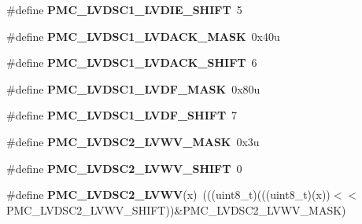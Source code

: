 \begin{DoxyCompactItemize}
\item 
\#define {\bfseries P\+M\+C\+\_\+\+L\+V\+D\+S\+C1\+\_\+\+L\+V\+D\+I\+E\+\_\+\+S\+H\+I\+FT}~5\hypertarget{group__PMC__Register__Masks_ga30ca240c9254a7e76123a3cf2bfdc40e}{}\label{group__PMC__Register__Masks_ga30ca240c9254a7e76123a3cf2bfdc40e}

\item 
\#define {\bfseries P\+M\+C\+\_\+\+L\+V\+D\+S\+C1\+\_\+\+L\+V\+D\+A\+C\+K\+\_\+\+M\+A\+SK}~0x40u\hypertarget{group__PMC__Register__Masks_ga65d04677ca16ad916563d6673cb8ecaa}{}\label{group__PMC__Register__Masks_ga65d04677ca16ad916563d6673cb8ecaa}

\item 
\#define {\bfseries P\+M\+C\+\_\+\+L\+V\+D\+S\+C1\+\_\+\+L\+V\+D\+A\+C\+K\+\_\+\+S\+H\+I\+FT}~6\hypertarget{group__PMC__Register__Masks_ga56654042b7934ca0e6c51f21db7d1201}{}\label{group__PMC__Register__Masks_ga56654042b7934ca0e6c51f21db7d1201}

\item 
\#define {\bfseries P\+M\+C\+\_\+\+L\+V\+D\+S\+C1\+\_\+\+L\+V\+D\+F\+\_\+\+M\+A\+SK}~0x80u\hypertarget{group__PMC__Register__Masks_ga44ae12d2d3e732cd25a897092a7e9ada}{}\label{group__PMC__Register__Masks_ga44ae12d2d3e732cd25a897092a7e9ada}

\item 
\#define {\bfseries P\+M\+C\+\_\+\+L\+V\+D\+S\+C1\+\_\+\+L\+V\+D\+F\+\_\+\+S\+H\+I\+FT}~7\hypertarget{group__PMC__Register__Masks_ga75efd4534766aaa126efff96d241de61}{}\label{group__PMC__Register__Masks_ga75efd4534766aaa126efff96d241de61}

\item 
\#define {\bfseries P\+M\+C\+\_\+\+L\+V\+D\+S\+C2\+\_\+\+L\+V\+W\+V\+\_\+\+M\+A\+SK}~0x3u\hypertarget{group__PMC__Register__Masks_gaab1198a446bb9b8412589eeb12311666}{}\label{group__PMC__Register__Masks_gaab1198a446bb9b8412589eeb12311666}

\item 
\#define {\bfseries P\+M\+C\+\_\+\+L\+V\+D\+S\+C2\+\_\+\+L\+V\+W\+V\+\_\+\+S\+H\+I\+FT}~0\hypertarget{group__PMC__Register__Masks_gabd2e288b833d9e66c422b814dc7b5f03}{}\label{group__PMC__Register__Masks_gabd2e288b833d9e66c422b814dc7b5f03}

\item 
\#define {\bfseries P\+M\+C\+\_\+\+L\+V\+D\+S\+C2\+\_\+\+L\+V\+WV}(x)~(((uint8\+\_\+t)(((uint8\+\_\+t)(x))$<$$<$P\+M\+C\+\_\+\+L\+V\+D\+S\+C2\+\_\+\+L\+V\+W\+V\+\_\+\+S\+H\+I\+FT))\&P\+M\+C\+\_\+\+L\+V\+D\+S\+C2\+\_\+\+L\+V\+W\+V\+\_\+\+M\+A\+SK)\hypertarget{group__PMC__Register__Masks_ga4599ee84bb111c3f42a8613447ca823d}{}\label{group__PMC__Register__Masks_ga4599ee84bb111c3f42a8613447ca823d}


\end{DoxyCompactItemize}
